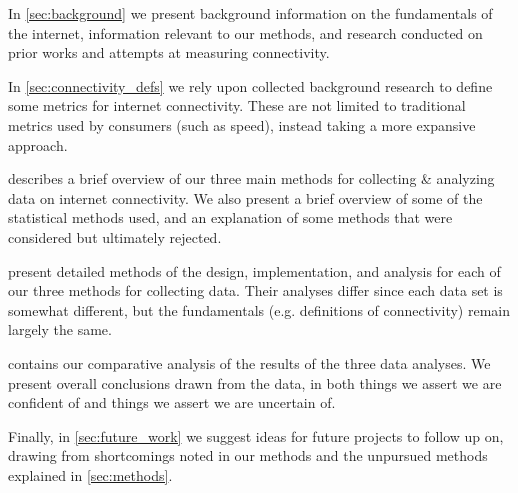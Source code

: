 In \cref{sec:background} we present background information on the fundamentals of the internet, information relevant to our methods, and research conducted on prior works and attempts at measuring connectivity.

In \cref{sec:connectivity_defs} we rely upon collected background research to define some metrics for internet connectivity. These are not limited to traditional metrics used by consumers (such as speed), instead taking a more expansive approach.

 describes a brief overview of our three main methods for collecting \& analyzing data on internet connectivity. We also present a brief overview of some of the statistical methods used, and an explanation of some methods that were considered but ultimately rejected.

 present detailed methods of the design, implementation, and analysis for each of our three methods for collecting data. Their analyses differ since each data set is somewhat different, but the fundamentals (e.g. definitions of connectivity) remain largely the same.

 contains our comparative analysis of the results of the three data analyses. We present overall conclusions drawn from the data, in both things we assert we are confident of and things we assert we are uncertain of.

Finally, in \cref{sec:future_work} we suggest ideas for future projects to follow up on, drawing from shortcomings noted in our methods and the unpursued methods explained in \cref{sec:methods}.
